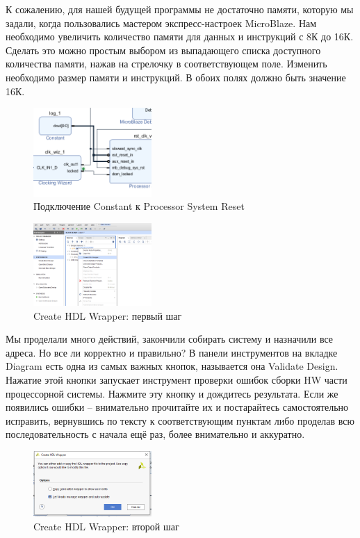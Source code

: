 \documentclass[a4paper,oneside ,14pt]{extreport}
\begin{document}
К сожалению, для нашей будущей программы не достаточно памяти, которую 
мы задали, когда пользовались мастером экспресс-настроек MicroBlaze. 
Нам необходимо увеличить количество памяти для данных и инструкций с 8К до 
16К. Сделать это можно простым выбором из выпадающего списка доступного 
количества памяти, нажав на стрелочку в соответствующем поле. Изменить 
необходимо размер памяти и инструкций. В обоих полях должно быть значение 16К.

\begin{figure}[!ht]
	\centering
	\includegraphics[width=0.4\textwidth]{image/log_1.png}
	\caption{Подключение Constant к Processor System Reset}
	\label{m_44}
\end{figure}

\begin{figure}[!ht]
	\centering
	\includegraphics[width=0.4\textwidth]{image/m_46.png}
	\caption{Create HDL Wrapper: первый шаг}
	\label{m_46}
\end{figure}

Мы проделали много действий, закончили собирать систему и назначили все 
адреса. Но все ли корректно и правильно? В панели инструментов на вкладке 
Diagram есть одна из самых важных кнопок, называется она Validate Design. Нажатие этой кнопки запускает инструмент проверки 
ошибок сборки HW части процессорной системы. Нажмите эту кнопку и дождитесь результата. Если же появились ошибки – внимательно прочитайте их и постарайтесь самостоятельно исправить, вернувшись по тексту к соответствующим пунктам либо проделав всю последовательность с начала ещё раз, более внимательно и аккуратно.

\begin{figure}[!ht]
	\centering
	\includegraphics[width=0.4\textwidth]{image/m_47.png}
	\caption{Create HDL Wrapper: второй шаг}
	\label{m_47}
\end{figure}
\end{document}
